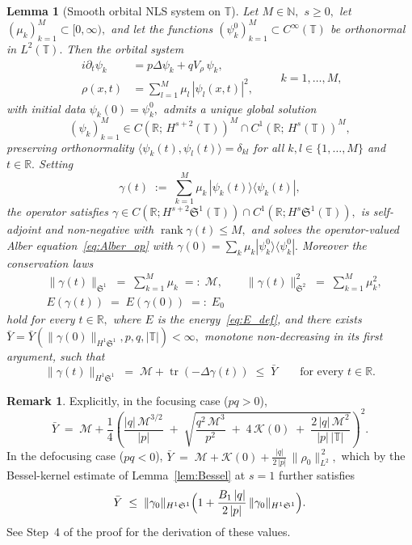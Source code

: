 \documentclass[11pt]{amsart}
\newtheorem{lemma}[theorem]{Lemma}
\theoremstyle{definition}
\newtheorem{remark}[theorem]{Remark}
\newcommand{\R}{\mathbb{R}}
\newcommand{\T}{\mathbb{T}}
\newcommand{\Sp}{\mathfrak{S}}
\DeclareMathOperator{\tr}{tr}
\begin{document}
\begin{lemma}[Smooth orbital NLS system on $\T$]
\label{lem:finite_NLS}
Let $M\in\mathbb{N},$ $s\ge 0,$ let $(\mu_k)_{k=1}^M\subset[0,\infty),$ and let the functions $(\psi_k^0)_{k=1}^M\subset C^\infty(\T)$ be orthonormal in $L^2(\T).$ Then the orbital system
\begin{equation}\label{eq:Alber_system_finite_NLS}
\begin{aligned}
  i\partial_t\psi_k
  &=p\Delta\psi_k+qV_\rho\,\psi_k,\\
  \rho(x,t)
  &=\sum_{l=1}^{M}\mu_l\,|\psi_l(x,t)|^2,
\end{aligned}
\qquad k=1,\dots,M,
\end{equation}
with initial data $\psi_k(0)=\psi_k^0,$ admits a unique global solution
\[
  (\psi_k)_{k=1}^M\in C(\R;\,H^{s+2}(\T))^M\cap C^1(\R;\,H^s(\T))^M,
\]
preserving orthonormality $\langle\psi_k(t),\psi_l(t)\rangle=\delta_{kl}$ for all $k,l\in\{1,\dots,M\}$ and $t\in\R.$ Setting
\begin{equation}\label{eq:Alber_system_finite}
  \gamma(t)\;:=\;\sum_{k=1}^M\mu_k\,|\psi_k(t)\rangle\langle\psi_k(t)|,
\end{equation}
the operator satisfies $\gamma\in C(\R;H^{s+2}\Sp^1(\T))\cap C^1(\R;H^s\Sp^1(\T)),$ is self-adjoint and non-negative with $\operatorname{rank}\gamma(t)\le M,$ and solves the operator-valued Alber equation~\eqref{eq:Alber_op} with $\gamma(0)=\sum_k\mu_k|\psi_k^0\rangle\langle\psi_k^0|.$ Moreover the conservation laws
\begin{equation}\label{eq:finiteNLS_conservation}
\begin{aligned}
  &\|\gamma(t)\|_{\Sp^1}\;=\;\sum_{k=1}^M\mu_k\;=:\;\mathcal{M},
  \qquad
  \|\gamma(t)\|_{\Sp^2}^2\;=\;\sum_{k=1}^M\mu_k^{2},\\
  &E(\gamma(t))\;=\;E(\gamma(0))\;=:\;E_0
\end{aligned}
\end{equation}
hold for every $t\in\R,$ where $E$ is the energy~\eqref{eq:E_def}, and there exists $\bar Y=\bar Y(\|\gamma(0)\|_{H^1\Sp^1},p,q,|\T|)<\infty,$ monotone non-decreasing in its first argument, such that
\begin{equation}\label{eq:Ybar_finiteNLS_stmt}
  \|\gamma(t)\|_{H^1\Sp^1}\;=\;\mathcal{M}+\tr(-\Delta\gamma(t))\;\le\;\bar Y
  \qquad\text{for every }t\in\R.
\end{equation}
\end{lemma}


\begin{remark}\label{rem:barY}
Explicitly, in the focusing case ($pq>0$),
\[
  \bar Y\;=\;\mathcal{M}+ \frac{1}{4}\left(\frac{|q|\,\mathcal{M}^{3/2}}{|p|}\;+\;\sqrt{\frac{q^{2}\,\mathcal{M}^{3}}{p^{2}}\;+\;4\,\mathcal{K}(0)\;+\;\frac{2\,|q|\,\mathcal{M}^{2}}{|p|\,|\T|}}\right)^2.
\]
In the defocusing case ($pq<0$),
$
  \bar Y\;=\;\mathcal{M}+\mathcal{K}(0)+\frac{|q|}{2\,|p|}\,\|\rho_0\|_{L^2}^{\,2},
$
which by the Bessel-kernel estimate of Lemma~\ref{lem:Bessel} at $s=1$ further satisfies
\[
  \bar Y\;\le\;\|\gamma_0\|_{H^1\Sp^1}\Bigl(1+\frac{B_1\,|q|}{2\,|p|}\,\|\gamma_0\|_{H^1\Sp^1}\Bigr).
\]
See Step~4 of the proof for the derivation of these values.
\end{remark}
\end{document}
